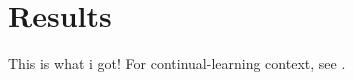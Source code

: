 \section{Results}

This is what i got! For continual-learning context, see \cite{kirkpatrick2017overcoming}.

